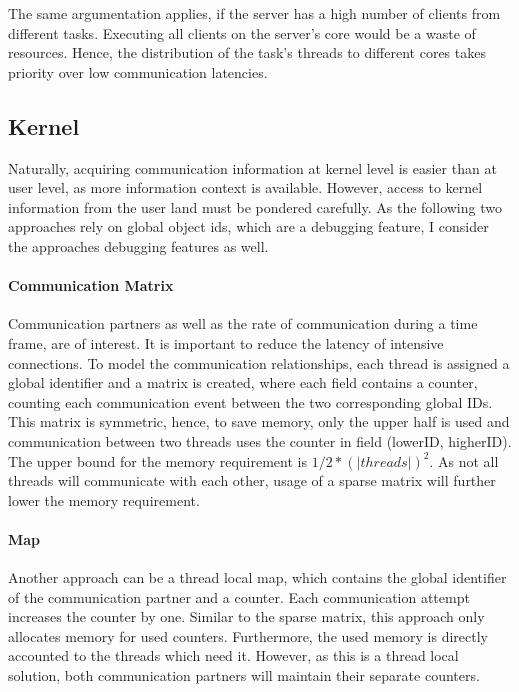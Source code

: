 The same argumentation applies, if the server has a high number of clients from
different tasks.
Executing all clients on the server's core would be a waste of resources.
Hence, the distribution of the task's threads to different cores takes priority
over low communication latencies.


\subsection{Kernel}
Naturally, acquiring communication information at kernel level is easier than
at user level, as more information context is available.
However, access to kernel information from the user land must be pondered carefully.
As the following two approaches rely on global object ids, which are a debugging
feature, I consider the approaches debugging features as well.


\paragraph{Communication Matrix}
Communication partners as well as the rate of communication during a time
frame, are of interest.
It is important to reduce the latency of intensive connections.
To model the communication relationships, each thread is assigned a global
identifier and a matrix is created, where each field contains a counter,
counting each communication event between the two corresponding global IDs.
This matrix is symmetric, hence, to save memory, only the upper half is used
and communication between two threads uses the counter in field
(lowerID, higherID).
The upper bound for the memory requirement is $1/2 * (|threads|)^2$.
As not all threads will communicate with each other, usage of a sparse matrix
will further lower the memory requirement.

\paragraph{Map}
Another approach can be a thread local map, which contains the global
identifier of the communication partner and a counter.
Each communication attempt increases the counter by one.
Similar to the sparse matrix, this approach only allocates memory for used
counters.
Furthermore, the used memory is directly accounted to the threads which need it.
However, as this is a thread local solution, both communication partners will
maintain their separate counters.


